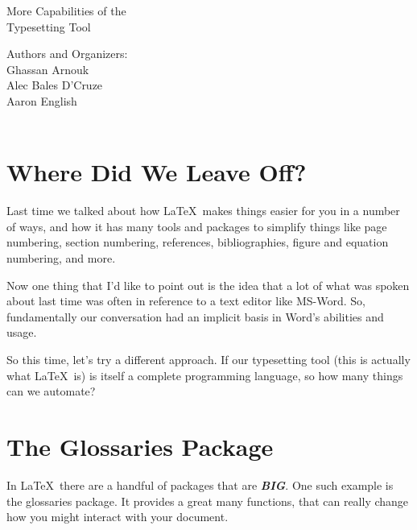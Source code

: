 \documentclass[hidelinks, float=false, crop=false]{article}
\begin{document}
{}
    \begin{center}
        \vspace*{1cm}
        {\fontsize{30}{50}\selectfont {\bfseries Hello Again \LaTeX\\}}
        \vspace{3cm}
        {\LARGE More Capabilities of the\\
            Typesetting Tool\\}
        \vspace{8cm}
    \end{center}
    \begin{flushright}
        Authors and Organizers:\\
        Ghassan Arnouk\\
        Alec Bales D'Cruze\\
        Aaron English\\
        \\
    \end{flushright}
    \thispagestyle{empty}


    \clearpage
    \tableofcontents
    \clearpage
    \section{Where Did We Leave Off?}
        Last time we talked about how \LaTeX~makes things easier for you in a number of ways, and 
        how it has many tools and packages to simplify things like page numbering, section numbering,
        references, bibliographies, figure and equation numbering, and more. 

        Now one thing that I'd like to point out is the idea that a lot of what was spoken about
        last time was often in reference to a text editor like MS-Word. So, fundamentally our 
        conversation had an implicit basis in Word's abilities and usage. 

        So this time, let's try a different approach. If our typesetting tool (this is actually what
        \LaTeX~is) is itself a complete programming language, so how many things can we automate?

    \section{The Glossaries Package}
        In \LaTeX~there are a handful of packages that are \textbf{\textit{BIG}}. One such example
        is the glossaries package. It provides a great many functions, that can really change how
        you might interact with your document. 
\end{document}
